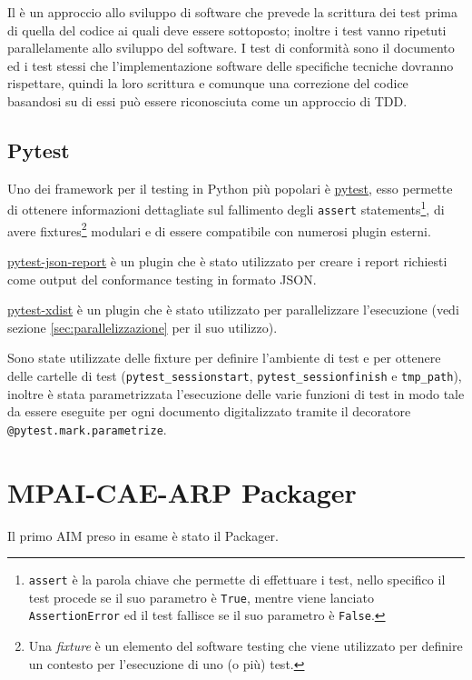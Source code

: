 Il  è un approccio allo sviluppo di software che prevede la scrittura dei test prima di quella del codice ai quali deve essere sottoposto; inoltre i test vanno ripetuti parallelamente allo sviluppo del software.
I test di conformità sono il documento ed i test stessi che l'implementazione software delle specifiche tecniche dovranno rispettare, quindi la loro scrittura e comunque una correzione del codice basandosi su di essi può essere riconosciuta come un approccio di \ac{TDD}. %


\subsection{Pytest} \label{ssec:pytest} %
Uno dei framework per il testing in Python più popolari è \href{https://pytest.org}{pytest}, esso permette di ottenere informazioni dettagliate sul fallimento degli \texttt{assert} statements\footnote{\texttt{assert} è la parola chiave che permette di effettuare i test, nello specifico il test procede se il suo parametro è \texttt{True}, mentre viene lanciato \texttt{AssertionError} ed il test fallisce se il suo parametro è \texttt{False}.}, di avere fixtures\footnote{Una \textit{fixture} è un elemento del software testing che viene utilizzato per definire un contesto per l'esecuzione di uno (o più) test.} modulari e di essere compatibile con numerosi plugin esterni.

\href{https://github.com/numirias/pytest-json-report}{pytest-json-report} è un plugin che è stato utilizzato per creare i report richiesti come output del conformance testing in formato JSON.

\href{https://pytest-xdist.readthedocs.io/}{pytest-xdist} è un plugin che è stato utilizzato per parallelizzare l'esecuzione (vedi sezione \ref{sec:parallelizzazione} per il suo utilizzo).

Sono state utilizzate delle fixture per definire l'ambiente di test e per ottenere delle cartelle di test (\verb|pytest_sessionstart|, \verb|pytest_sessionfinish| e \verb|tmp_path|), inoltre è stata parametrizzata l'esecuzione delle varie funzioni di test in modo tale da essere eseguite per ogni documento digitalizzato tramite il decoratore \texttt{@pytest.mark.parametrize}.


\section{MPAI-CAE-ARP Packager} \label{sec:test-packager}
Il primo \ac{AIM} preso in esame è stato il Packager.

